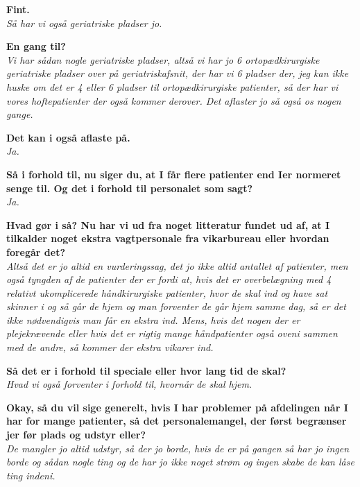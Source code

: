 \textbf{Fint.} \\
\noindent
\textit{Så har vi også geriatriske pladser jo.} \\
\noindent


\textbf{En gang til?} \\
\noindent
\textit{Vi har sådan nogle geriatriske pladser, altså vi har jo 6 ortopædkirurgiske geriatriske pladser over på geriatriskafsnit, der har vi 6 pladser der, jeg kan ikke huske om det er 4 eller 6 pladser til ortopædkirurgiske patienter, så der har vi vores hoftepatienter der også kommer derover. Det aflaster jo så også os nogen gange.} \\
\noindent

\textbf{Det kan i også aflaste på.} \\
\noindent
\textit{Ja.} \\
\noindent

\textbf{Så i forhold til, nu siger du, at I får flere patienter end Ier normeret senge til. Og det i forhold til personalet som sagt?} \\
\noindent
\textit{Ja.} \\
\noindent


\textbf{Hvad gør i så? Nu har vi ud fra noget litteratur fundet ud af, at I tilkalder noget ekstra vagtpersonale fra vikarbureau eller hvordan foregår det? } \\
\noindent
\textit{Altså det er jo altid en vurderingssag, det jo ikke altid antallet af patienter, men også tyngden af de patienter der er fordi at, hvis det er overbelægning med 4 relativt ukomplicerede håndkirurgiske patienter, hvor de skal ind og have sat skinner i og så går de hjem og man forventer de går hjem samme dag, så er det ikke nødvendigvis man får en ekstra ind. Mens, hvis det nogen der er plejekrævende eller hvis det er rigtig mange håndpatienter også oveni sammen med de andre, så kommer der ekstra vikarer ind. } \\
\noindent


\textbf{Så det er i forhold til speciale eller hvor lang tid de skal?} \\
\noindent
\textit{ Hvad vi også forventer i forhold til, hvornår de skal hjem.} \\
\noindent


\textbf{Okay, så du vil sige generelt, hvis I har problemer på afdelingen når I har for mange patienter, så det personalemangel, der først begrænser jer før plads og udstyr eller?} \\
\noindent
\textit{De mangler jo altid udstyr, så der jo borde, hvis de er på gangen så har jo ingen borde og sådan nogle ting og de har jo ikke noget strøm og ingen skabe de kan låse ting indeni.} \\
\noindent

